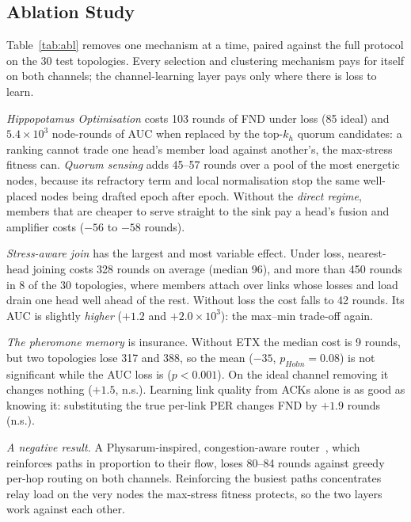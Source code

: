 \documentclass[conference]{IEEEtran}
\begin{document}
\subsection{Ablation Study}
Table~\ref{tab:abl} removes one mechanism at a time, paired against the full protocol on the 30 test topologies. Every selection and clustering mechanism pays for itself on both channels; the channel-learning layer pays only where there is loss to learn.

\emph{Hippopotamus Optimisation} costs 103 rounds of FND under loss (85 ideal) and $5.4\times10^3$ node-rounds of AUC when replaced by the top-$k_h$ quorum candidates: a ranking cannot trade one head's member load against another's, the max-stress fitness can. \emph{Quorum sensing} adds 45--57 rounds over a pool of the most energetic nodes, because its refractory term and local normalisation stop the same well-placed nodes being drafted epoch after epoch. Without the \emph{direct regime}, members that are cheaper to serve straight to the sink pay a head's fusion and amplifier costs ($-56$ to $-58$ rounds).

\emph{Stress-aware join} has the largest and most variable effect. Under loss, nearest-head joining costs 328 rounds on average (median 96), and more than 450 rounds in 8 of the 30 topologies, where members attach over links whose losses and load drain one head well ahead of the rest. Without loss the cost falls to 42 rounds. Its AUC is slightly \emph{higher} ($+1.2$ and $+2.0\times10^3$): the max--min trade-off again.

\emph{The pheromone memory} is insurance. Without ETX the median cost is 9 rounds, but two topologies lose 317 and 388, so the mean ($-35$, $p_{Holm}=0.08$) is not significant while the AUC loss is ($p<0.001$). On the ideal channel removing it changes nothing ($+1.5$, n.s.). Learning link quality from ACKs alone is as good as knowing it: substituting the true per-link PER changes FND by $+1.9$ rounds (n.s.).

\emph{A negative result.} A Physarum-inspired, congestion-aware router~\cite{tero2007physarum}, which reinforces paths in proportion to their flow, loses 80--84 rounds against greedy per-hop routing on both channels. Reinforcing the busiest paths concentrates relay load on the very nodes the max-stress fitness protects, so the two layers work against each other.
\end{document}
